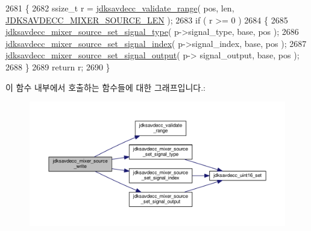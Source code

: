 \begin{DoxyCode}
2681 \{
2682     ssize\_t r = \hyperlink{group__util_ga9c02bdfe76c69163647c3196db7a73a1}{jdksavdecc\_validate\_range}( pos, len, 
      \hyperlink{group__mixer__source_ga19582a125589306c00003f1d783ece52}{JDKSAVDECC\_MIXER\_SOURCE\_LEN} );
2683     \textcolor{keywordflow}{if} ( r >= 0 )
2684     \{
2685         \hyperlink{group__mixer__source_ga406771f608962aa6b61c3cf30ff30cb9}{jdksavdecc\_mixer\_source\_set\_signal\_type}( p->signal\_type, 
      base, pos );
2686         \hyperlink{group__mixer__source_ga2eb3d890483e745c71cbf313902bdbc9}{jdksavdecc\_mixer\_source\_set\_signal\_index}( p->signal\_index, 
      base, pos );
2687         \hyperlink{group__mixer__source_ga91eee06b717cf35ba2abd82af0ff236c}{jdksavdecc\_mixer\_source\_set\_signal\_output}( p->
      signal\_output, base, pos );
2688     \}
2689     \textcolor{keywordflow}{return} r;
2690 \}
\end{DoxyCode}


이 함수 내부에서 호출하는 함수들에 대한 그래프입니다.\+:
\nopagebreak
\begin{figure}[H]
\begin{center}
\leavevmode
\includegraphics[width=350pt]{group__mixer__source_ga16ada06dfdd04c7640671b987f93058f_cgraph}
\end{center}
\end{figure}


